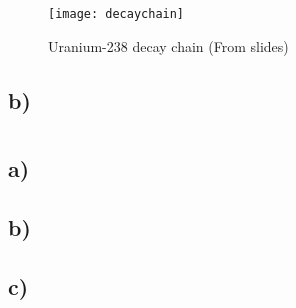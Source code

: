 \documentclass{article}
\newcommand{\<}[1]{\left\langle #1 \right\rangle }
\begin{document}
\begin{figure}[h]
	\caption{Uranium-238 decay chain (From slides)}
	\centering
	\texttt{[image: decaychain]}
\end{figure}

\subsection{b)}


\section{}

\subsection{a)}

\subsection{b)}

\subsection{c)}
\end{document}
